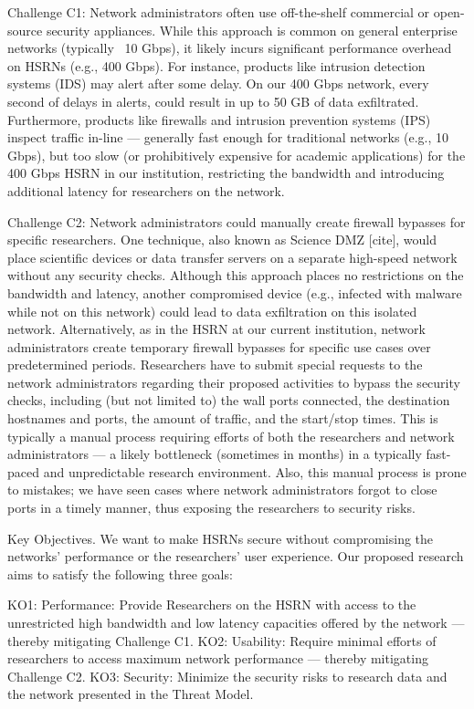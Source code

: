 Challenge C1: Network administrators often use off-the-shelf commercial or open-source security appliances. While this approach is common on general enterprise networks (typically ~10 Gbps), it likely incurs significant performance overhead on HSRNs (e.g., 400 Gbps). For instance, products like intrusion detection systems (IDS) may alert after some delay. On our 400 Gbps network, every second of delays in alerts, could result in up to 50 GB of data exfiltrated. Furthermore, products like firewalls and intrusion prevention systems (IPS) inspect traffic in-line — generally fast enough for traditional networks (e.g., 10 Gbps), but too slow (or prohibitively expensive for academic applications) for the 400 Gbps HSRN in our institution, restricting the bandwidth and introducing additional latency for researchers on the network.

Challenge C2: Network administrators could manually create firewall bypasses for specific researchers. One technique, also known as Science DMZ [cite], would place scientific devices or data transfer servers on a separate high-speed network without any security checks. Although this approach places no restrictions on the bandwidth and latency, another compromised device (e.g., infected with malware while not on this network) could lead to data exfiltration on this isolated network. Alternatively, as in the HSRN at our current institution, network administrators create temporary firewall bypasses for specific use cases over predetermined periods. Researchers have to submit special requests to the network administrators regarding their proposed activities to bypass the security checks, including (but not limited to) the wall ports connected, the destination hostnames and ports, the amount of traffic, and the start/stop times. This is typically a manual process requiring efforts of both the researchers and network administrators — a likely bottleneck (sometimes in months) in a typically fast-paced and unpredictable research environment. Also, this manual process is prone to mistakes; we have seen cases where network administrators forgot to close ports in a timely manner, thus exposing the researchers to security risks.

Key Objectives. We want to make HSRNs secure without compromising the networks’ performance or the researchers’ user experience. Our proposed research aims to satisfy the following three goals:

KO1: Performance: Provide Researchers on the HSRN with access to  the unrestricted high bandwidth and low latency capacities offered by the network — thereby mitigating Challenge C1.
KO2: Usability: Require minimal efforts of researchers to access maximum network performance — thereby mitigating Challenge C2.
KO3: Security: Minimize the security risks to research data and the network presented in the Threat Model.

